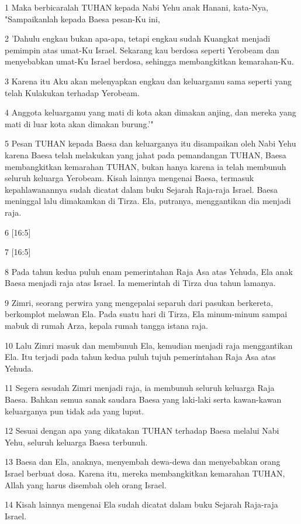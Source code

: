 \par 1 Maka berbicaralah TUHAN kepada Nabi Yehu anak Hanani, kata-Nya, "Sampaikanlah kepada Baesa pesan-Ku ini,
\par 2 'Dahulu engkau bukan apa-apa, tetapi engkau sudah Kuangkat menjadi pemimpin atas umat-Ku Israel. Sekarang kau berdosa seperti Yerobeam dan menyebabkan umat-Ku Israel berdosa, sehingga membangkitkan kemarahan-Ku.
\par 3 Karena itu Aku akan melenyapkan engkau dan keluargamu sama seperti yang telah Kulakukan terhadap Yerobeam.
\par 4 Anggota keluargamu yang mati di kota akan dimakan anjing, dan mereka yang mati di luar kota akan dimakan burung.'"
\par 5 Pesan TUHAN kepada Baesa dan keluarganya itu disampaikan oleh Nabi Yehu karena Baesa telah melakukan yang jahat pada pemandangan TUHAN, Baesa membangkitkan kemarahan TUHAN, bukan hanya karena ia telah membunuh seluruh keluarga Yerobeam. Kisah lainnya mengenai Baesa, termasuk kepahlawanannya sudah dicatat dalam buku Sejarah Raja-raja Israel. Baesa meninggal lalu dimakamkan di Tirza. Ela, putranya, menggantikan dia menjadi raja.
\par 6 [16:5]
\par 7 [16:5]
\par 8 Pada tahun kedua puluh enam pemerintahan Raja Asa atas Yehuda, Ela anak Baesa menjadi raja atas Israel. Ia memerintah di Tirza dua tahun lamanya.
\par 9 Zimri, seorang perwira yang mengepalai separuh dari pasukan berkereta, berkomplot melawan Ela. Pada suatu hari di Tirza, Ela minum-minum sampai mabuk di rumah Arza, kepala rumah tangga istana raja.
\par 10 Lalu Zimri masuk dan membunuh Ela, kemudian menjadi raja menggantikan Ela. Itu terjadi pada tahun kedua puluh tujuh pemerintahan Raja Asa atas Yehuda.
\par 11 Segera sesudah Zimri menjadi raja, ia membunuh seluruh keluarga Raja Baesa. Bahkan semua sanak saudara Baesa yang laki-laki serta kawan-kawan keluarganya pun tidak ada yang luput.
\par 12 Sesuai dengan apa yang dikatakan TUHAN terhadap Baesa melalui Nabi Yehu, seluruh keluarga Baesa terbunuh.
\par 13 Baesa dan Ela, anaknya, menyembah dewa-dewa dan menyebabkan orang Israel berbuat dosa. Karena itu, mereka membangkitkan kemarahan TUHAN, Allah yang harus disembah oleh orang Israel.
\par 14 Kisah lainnya mengenai Ela sudah dicatat dalam buku Sejarah Raja-raja Israel.
